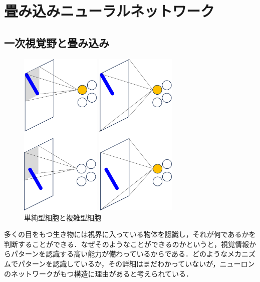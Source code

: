 \documentclass[a4paper,11pt]{jsreport}
\begin{document}
\section{畳み込みニューラルネットワーク}
\subsection{一次視覚野と畳み込み}
\begin{figure}[H]
  \begin{minipage}[b]{0.5\linewidth}
    \centering
    \includegraphics[height=8cm]{image/単純型細胞.png}
  \end{minipage}
  \begin{minipage}[b]{0.5\linewidth}
    \centering
    \includegraphics[height=8cm]{image/複雑型細胞.png}
  \end{minipage}
  \caption{単純型細胞と複雑型細胞}
  \label{単純型細胞と複雑型細胞}
\end{figure}
多くの目をもつ生き物には視界に入っている物体を認識し，それが何であるかを判断することができる．なぜそのようなことができるのかというと，視覚情報からパターンを認識する高い能力が備わっているからである．どのようなメカニズムでパターンを認識しているか，その詳細はまだわかっていないが，ニューロンのネットワークがもつ構造に理由があると考えられている．\par
\end{document}
